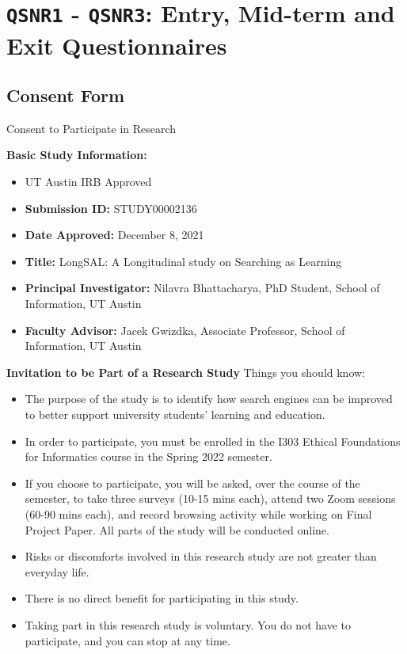\documentclass[letterpaper, nobind]{templates/ociamthesis}
\providecommand{\tightlist}{%
  \setlength{\itemsep}{0pt}\setlength{\parskip}{0pt}}
\begin{document}
\hypertarget{qsnr1---qsnr3-entry-mid-term-and-exit-questionnaires}{%
\section{\texorpdfstring{\texttt{QSNR1} - \texttt{QSNR3}: Entry, Mid-term and Exit Questionnaires}{QSNR1 - QSNR3: Entry, Mid-term and Exit Questionnaires}}\label{qsnr1---qsnr3-entry-mid-term-and-exit-questionnaires}}

\hypertarget{app-qsnr-consent-form}{%
\subsection{Consent Form}\label{app-qsnr-consent-form}}

Consent to Participate in Research

\textbf{Basic Study Information:}

\begin{itemize}
\tightlist
\item
  UT Austin IRB Approved
\item
  \textbf{Submission ID:} STUDY00002136
\item
  \textbf{Date Approved:} December 8, 2021
\item
  \textbf{Title:} LongSAL: A Longitudinal study on Searching as Learning
\item
  \textbf{Principal Investigator:} Nilavra Bhattacharya, PhD Student, School of Information, UT Austin
\item
  \textbf{Faculty Advisor:} Jacek Gwizdka, Associate Professor, School of Information, UT Austin
\end{itemize}

\textbf{Invitation to be Part of a Research Study}
Things you should know:

\begin{itemize}
\tightlist
\item
  The purpose of the study is to identify how search engines can be improved to better support university students' learning and education.
\item
  In order to participate, you must be enrolled in the I303 Ethical Foundations for Informatics course in the Spring 2022 semester.
\item
  If you choose to participate, you will be asked, over the course of the semester, to take three surveys (10-15 mins each), attend two Zoom sessions (60-90 mins each), and record browsing activity while working on Final Project Paper. All parts of the study will be conducted online.
\item
  Risks or discomforts involved in this research study are not greater than everyday life.
\item
  There is no direct benefit for participating in this study.
\item
  Taking part in this research study is voluntary. You do not have to participate, and you can stop at any time.
\end{itemize}
\end{document}
